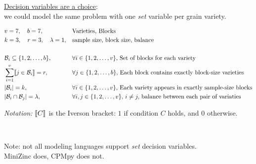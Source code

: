 \documentclass{cons-beamer}
\begin{document}
\begin{frame}
  \underline{Decision variables are a choice}: \\
  we could model the same problem with one \textit{set} variable per grain variety.\\
  
  \begin{example}
    \footnotesize
    \vspace{-1em}
    \begin{align*}
      &v = 7, \quad b = 7, &&\mbox{Varieties, Blocks} \\
      &k = 3, \quad r = 3, \quad \lambda = 1, &&\mbox{sample size, block size, balance} \\
      \\
      &\mathcal{B}_i \subseteq \{1, 2, \dots, b\}, \quad &&\forall i \in \{1, 2, \dots, v\}, \, \mbox{Set of blocks for each variety} \\
      &\sum_{i=1}^v \llbracket j \in \mathcal{B}_i \rrbracket = r, \quad &&\forall j \in \{1, 2, \dots, b\}, \, \mbox{Each block contains exactly block-size varieties} \\
      &|\mathcal{B}_i| = k, \quad &&\forall i \in \{1, 2, \dots, v\}, \, \mbox{Each variety appears in exactly sample-size blocks} \\
      &|\mathcal{B}_i \cap \mathcal{B}_j| = \lambda, \quad &&\forall i, j \in \{1, 2, \dots, v\}, \, i \neq j, \, \mbox{balance between each pair of variaties}
    \end{align*}
  \end{example}

  \textit{Notation:} $\llbracket C \rrbracket$ is the Iverson bracket: $1$ if condition $C$ holds, and $0$ otherwise.

  $ $

  \alert{Note}: not all modeling languages support \textit{set} decision variables. \\
MiniZinc does, CPMpy does not.
\end{frame}

\begin{flashcardminizinc}
\begin{frame}[fragile]
  \begin{example}
    \footnotesize
  \end{example}
  \begin{example}
    \footnotesize
  \end{example}
\end{frame}
\end{flashcardminizinc}
\end{document}
